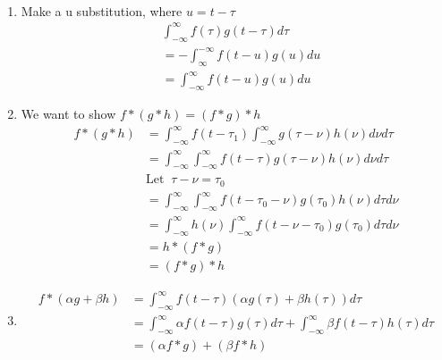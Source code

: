 \documentclass[letterpaper,12pt]{article}
\theoremstyle{definition}
\begin{document}
\\
\begin{enumerate}
    \item 
        Make a u substitution, where $u = t - \tau$
        \begin{align*}
            &\int^\infty_{-\infty} f(\tau)g(t-\tau)d\tau \\
            & = -\int^{-\infty}_\infty f(t-u)g(u) du \\
            & = \int^\infty_{-\infty} f(t-u)g(u) du
        \end{align*}
    \item
        We want to show $f*(g*h) = (f*g)*h$
        \begin{align*}
            f*(g*h) & = \int_{-\infty}^\infty f(t-\tau_1) \int_{-\infty}^\infty g(\tau-\nu)h(\nu)d\nu d\tau \\
            & = \int_{-\infty}^\infty \int_{-\infty}^\infty f(t-\tau)g(\tau - \nu)h(\nu)d\nu d\tau \\
            & \text{Let }~\tau - \nu = \tau_0 \\
            & = \int_{-\infty}^\infty \int_{-\infty}^\infty f(t-\tau_0 - \nu)g(\tau_0)h(\nu) d\tau d\nu \\
            & = \int_{-\infty}^\infty h(\nu) \int_{-\infty}^\infty f(t-\nu - \tau_0)g(\tau_0) d\tau d\nu \\
            & = h * (f*g) \\
            & = (f * g) * h
        \end{align*}
    \item
    \begin{align*}
    f*(\alpha g + \beta h) &= \int^{\infty}_{-\infty} f(t - \tau) (\alpha g(\tau) + \beta h(\tau)) d\tau \\
    &= \int^{\infty}_{-\infty} \alpha f(t - \tau) g(\tau) d\tau + \int^{\infty}_{-\infty} \beta f(t - \tau) h(\tau) d\tau \\
    &= (\alpha f * g) + (\beta f * h)    
    \end{align*}
\end{enumerate}
\end{document}
